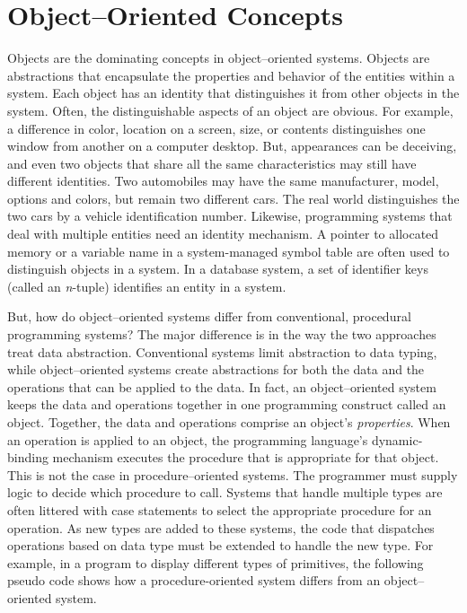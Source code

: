 \section{Object--Oriented Concepts}

Objects are the dominating concepts in object--oriented systems. Objects are abstractions that encapsulate the properties and behavior of the entities within a system. Each object has an identity that distinguishes it from other objects in the system. Often, the distinguishable aspects of an object are obvious. For example, a difference in color, location on a screen, size, or contents distinguishes one window from another on a computer desktop. But, appearances can be deceiving, and even two objects that share all the same characteristics may still have different identities. Two automobiles may have the same manufacturer, model, options and colors, but remain two different cars. The real world distinguishes the two cars by a vehicle identification number. Likewise, programming systems that deal with multiple entities need an identity mechanism. A pointer to allocated memory or a variable name in a system-managed symbol table are often used to distinguish objects in a system. In a database system, a set of identifier keys (called an \emph{n}-tuple) identifies an entity in a system.

But, how do object--oriented systems differ from conventional, procedural programming systems? The major difference is in the way the two approaches treat data abstraction. Conventional systems limit abstraction to data typing, while object--oriented systems create abstractions for both the data and the operations that can be applied to the data. In fact, an object--oriented system keeps the data and operations together in one programming construct called an object. Together, the data and operations comprise an object's \emph{properties}. When an operation is applied to an object, the programming language's dynamic-binding mechanism executes the procedure that is appropriate for that object. This is not the case in procedure--oriented systems. The programmer must supply logic to decide which procedure to call. Systems that handle multiple types are often littered with case statements to select the appropriate procedure for an operation. As new types are added to these systems, the code that dispatches operations based on data type must be extended to handle the new type. For example, in a program to display different types of primitives, the following pseudo code shows how a procedure-oriented system differs from an object--oriented system.

